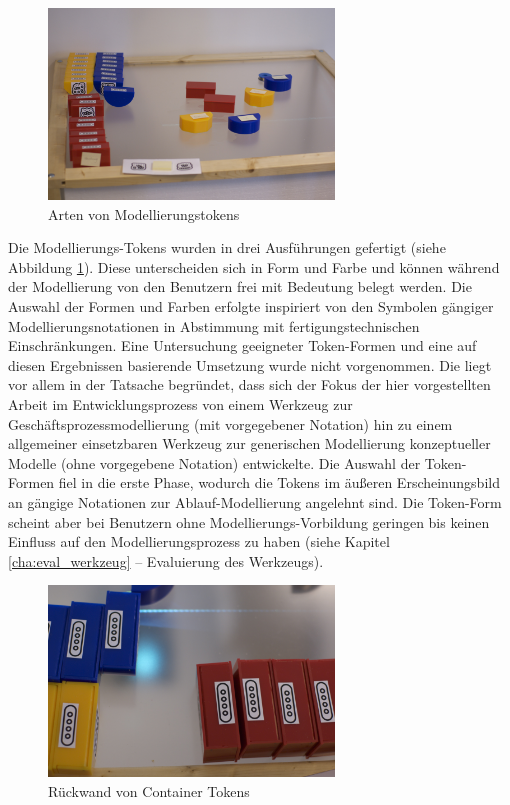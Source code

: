 \begin{figure}[htbp]
	\centering
		\includegraphics[height=2in]{img/ImplementierungInput/TokenTypes.jpg}
	\caption{Arten von Modellierungstokens}
	\label{fig:img_ImplementierungInput_TokenTypes}
\end{figure}


Die Modellierungs-Tokens wurden in drei Ausführungen gefertigt (siehe Abbildung \ref{fig:img_ImplementierungInput_TokenTypes}). Diese unterscheiden sich in Form und Farbe und können während der Modellierung von den Benutzern frei mit Bedeutung belegt werden. Die Auswahl der Formen und Farben erfolgte inspiriert von den Symbolen gängiger Modellierungsnotationen in Abstimmung mit fertigungstechnischen Einschränkungen. Eine Untersuchung geeigneter Token-Formen und eine auf diesen Ergebnissen basierende Umsetzung wurde nicht vorgenommen. Die liegt vor allem in der Tatsache begründet, dass sich der Fokus der hier vorgestellten Arbeit im Entwicklungsprozess von einem Werkzeug zur Geschäftsprozessmodellierung (mit vorgegebener Notation) hin zu einem allgemeiner einsetzbaren Werkzeug zur generischen Modellierung konzeptueller Modelle (ohne vorgegebene Notation) entwickelte. Die Auswahl der Token-Formen fiel in die erste Phase, wodurch die Tokens im äußeren Erscheinungsbild an gängige Notationen zur Ablauf-Modellierung angelehnt sind. Die Token-Form scheint aber bei Benutzern ohne Modellierungs-Vorbildung geringen bis keinen Einfluss auf den Modellierungsprozess zu haben (siehe Kapitel \ref{cha:eval_werkzeug} -- Evaluierung des Werkzeugs).

\begin{figure}[htbp]
	\centering
		\includegraphics[height=2in]{img/ImplementierungInput/ContainerRueckseite.jpg}
	\caption{Rückwand von Container Tokens}
	\label{fig:img_ImplementierungInput_ContainerRueckseite}
\end{figure}

